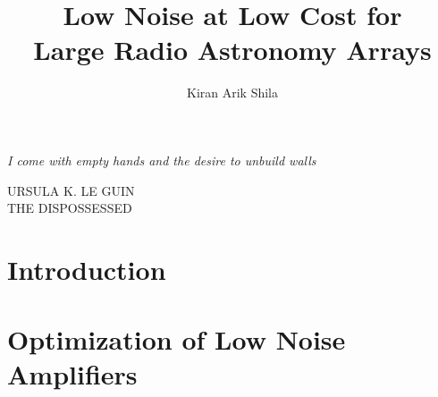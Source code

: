\documentclass[12pt]{caltech_thesis}
\newlength\longest
\begin{document}
\title{Low Noise at Low Cost for \\ Large Radio Astronomy Arrays}
\author{Kiran Arik Shila}

\address{Pasadena, California}                   



\maketitle[logo]

\clearpage
\null\vfill
\settowidth{}
\begin{center}
    \parbox{\longest}{%
  \raggedright{\large\itshape%
        I come with empty hands and the desire to unbuild walls\par\bigskip
  }   
  \raggedleft\tiny\MakeUppercase{Ursula K. Le Guin \\  The Dispossessed}\par%
}
\end{center}
\vfill\vfill
\clearpage





\begin{publishedcontent}[iknowwhattodo]
\nocite{shilaRapidDesignLNASubmitted}
\nocite{shilaGReXInstrumentOverviewSubmitted}
\end{publishedcontent}

\tableofcontents
\listoffigures
\listoftables

\mainmatter

\chapter{Introduction} \label{ch:intro}
\begin{refsection}

\printbibliography[heading=subbibliography]
\end{refsection}

\chapter{Optimization of Low Noise Amplifiers} \label{ch:lna_opt}
\begin{refsection}

\printbibliography[heading=subbibliography]
\end{refsection}
\end{document}
